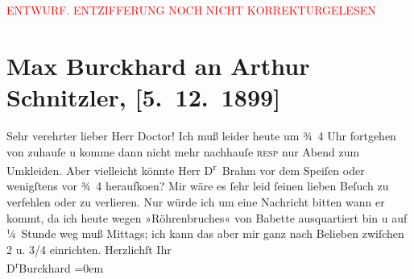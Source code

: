 
\begin{center}
            \textcolor{red}{ENTWURF. ENTZIFFERUNG NOCH NICHT KORREKTURGELESEN}
                      \end{center}
            
               \section[Max Burckhard an Arthur Schnitzler, {[}5. 12. 1899{]}]{ Max Burckhard an Arthur Schnitzler, {[}5. 12. 1899{]}}\nopagebreak{}\rehead{ }\begin{ledgroupsized}[t]{13cm}\normalsize\beginnumbering{} \toendnotes[C]{\smallbreak\pagebreak[2]} 
\toendnotes[C]{\smallbreak}\pstart{}{\pb}Sehr verehrter lieber Herr
                        Doctor!\pend\pstart
           Ich muß leider heute um ¾ 4 Uhr fortgehen von zuhauſe u komme dann
                    nicht mehr nachhauſe \textsc{reſp} nur Abend zum Umkleiden.
                    Aber vielleicht könnte Herr D\textsuperscript{r} Brahm vor dem Speiſen oder wenigſtens vor
                        ¾ 4 heraufko{\geminationm}en?  Mir wäre es ſehr leid ſeinen lieben
                    Beſuch zu verfehlen oder zu verlieren. Nur würde ich um eine Nachricht bitten
                    wann er kommt, da ich heute wegen »Röhrenbruches« von Babette ausquartiert bin u auf
                    ¼ Stunde weg muß Mittags; ich kann das aber mir ganz nach Belieben zwiſchen
                        2 u. 3/4 einrichten.\pend
           \pstart
           Herzlichſt Ihr{\\[\baselineskip]}\spacefill\mbox{D\textsuperscript{r}Burckhard}\pend
           \leftskip=0em{}\endnumbering{}\end{ledgroupsized}  \newcommand{\dateiname}{L01004}\newcommand{\titel}{Max Burckhard an Arthur Schnitzler, [5. 12. 1899]}\newcommand{\editorInnen}{Martin Anton Müller und Gerd-Hermann Susen}
      